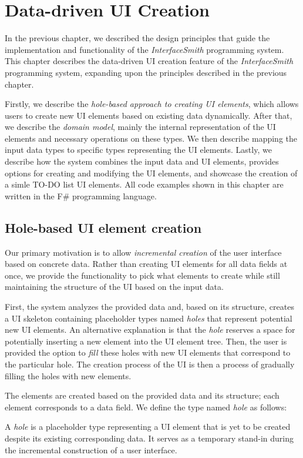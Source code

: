 \chapter{Data-driven UI Creation}
\label{chap:corelogic}

In the previous chapter, we described the design principles that guide the implementation and functionality of the \emph{InterfaceSmith} programming system.
This chapter describes the data-driven UI creation feature of the \emph{InterfaceSmith} programming system, expanding upon the principles described in the previous chapter.

Firstly, we describe the \emph{hole-based approach to creating UI elements}, which allows users to create new UI elements based on existing data dynamically.
After that, we describe the \emph{domain model}, mainly the internal representation of the UI elements and necessary operations on these types.
We then describe mapping the input data types to specific types representing the UI elements.
Lastly, we describe how the system combines the input data and UI elements, provides options for creating and modifying the UI elements, and showcase the creation of a simle TO-DO list UI elements.
All code examples shown in this chapter are written in the F\#\cite{fsharp} programming language.

\section{Hole-based UI element creation}
\label{sec:hole-based}
Our primary motivation is to allow \emph{incremental creation} of the user interface based on concrete data.
Rather than creating UI elements for all data fields at once, we provide the functionality to pick what elements to create while still maintaining the structure of the UI based on the input data.

First, the system analyzes the provided data and, based on its structure, creates a UI skeleton containing placeholder types named \emph{holes} that represent potential new UI elements.
An alternative explanation is that the \emph{hole} reserves a space for potentially inserting a new element into the UI element tree.
Then, the user is provided the option to \emph{fill} these holes with new UI elements that correspond to the particular hole.
The creation process of the UI is then a process of gradually filling the holes with new elements.

The elements are created based on the provided data and its structure; each element corresponds to a data field.
We define the type named \emph{hole} as follows:
\begin{defn}
	A \emph{hole} is a placeholder type representing a UI element that is yet to be created despite its existing corresponding data.
	It serves as a temporary stand-in during the incremental construction of a user interface.
\end{defn}

